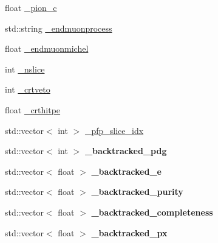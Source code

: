 \begin{DoxyCompactItemize}
\item 
float \hyperlink{classanalysis_1_1DefaultAnalysis_a9978effbcfba62536fc88a73fa985fe9}{\-\_\-pion\-\_\-c}
\item 
std\-::string \hyperlink{classanalysis_1_1DefaultAnalysis_a8cbb24a231e167258d2914f92bc4af22}{\-\_\-endmuonprocess}
\item 
float \hyperlink{classanalysis_1_1DefaultAnalysis_a3797bcb310074825add03ce03175fdc3}{\-\_\-endmuonmichel}
\item 
int \hyperlink{classanalysis_1_1DefaultAnalysis_a3eddf49910782afed7f324755fffe681}{\-\_\-nslice}
\item 
int \hyperlink{classanalysis_1_1DefaultAnalysis_a84ce9904fa527012a65c2be203a38d38}{\-\_\-crtveto}
\item 
float \hyperlink{classanalysis_1_1DefaultAnalysis_a900ec35e3ca4a00d4625a1e632bb6b40}{\-\_\-crthitpe}
\item 
std\-::vector$<$ int $>$ \hyperlink{classanalysis_1_1DefaultAnalysis_acbf0c279993cbefca72f38bc5e9f6627}{\-\_\-pfp\-\_\-slice\-\_\-idx}
\item 
\hypertarget{classanalysis_1_1DefaultAnalysis_a28bd59dce75b8fd3be70bd4996354ae9}{std\-::vector$<$ int $>$ {\bfseries \-\_\-backtracked\-\_\-pdg}}\label{classanalysis_1_1DefaultAnalysis_a28bd59dce75b8fd3be70bd4996354ae9}

\item 
\hypertarget{classanalysis_1_1DefaultAnalysis_a2c16b4988d0bccf8b7ef96a52c173b80}{std\-::vector$<$ float $>$ {\bfseries \-\_\-backtracked\-\_\-e}}\label{classanalysis_1_1DefaultAnalysis_a2c16b4988d0bccf8b7ef96a52c173b80}

\item 
\hypertarget{classanalysis_1_1DefaultAnalysis_ad08d9b30c434685e350c5f292d4df08b}{std\-::vector$<$ float $>$ {\bfseries \-\_\-backtracked\-\_\-purity}}\label{classanalysis_1_1DefaultAnalysis_ad08d9b30c434685e350c5f292d4df08b}

\item 
\hypertarget{classanalysis_1_1DefaultAnalysis_a60ef3ec6e332c118c088e0203fb858d6}{std\-::vector$<$ float $>$ {\bfseries \-\_\-backtracked\-\_\-completeness}}\label{classanalysis_1_1DefaultAnalysis_a60ef3ec6e332c118c088e0203fb858d6}

\item 
\hypertarget{classanalysis_1_1DefaultAnalysis_a047ee0f1b72f5335030480bc685dea5a}{std\-::vector$<$ float $>$ {\bfseries \-\_\-backtracked\-\_\-px}}\label{classanalysis_1_1DefaultAnalysis_a047ee0f1b72f5335030480bc685dea5a}


\end{DoxyCompactItemize}
